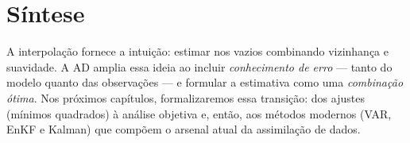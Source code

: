 \section{Síntese}
A interpolação fornece a intuição: estimar nos vazios combinando vizinhança e suavidade. A AD amplia essa ideia ao incluir \emph{conhecimento de erro} --- tanto do modelo quanto das observações --- e formular a estimativa como uma \emph{combinação ótima}. Nos próximos capítulos, formalizaremos essa transição: dos ajustes (mínimos quadrados) à análise objetiva e, então, aos métodos modernos (VAR, EnKF e Kalman) que compõem o arsenal atual da assimilação de dados.

